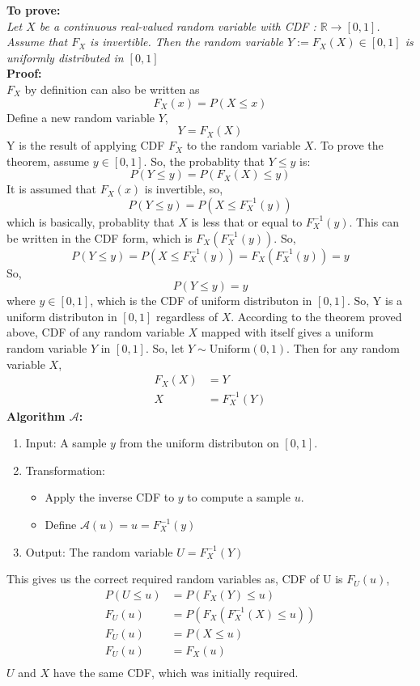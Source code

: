 \begin{solution}
	\textbf{To prove: }\\
	\emph{Let $X$ be a continuous real-valued random variable with CDF  : $\mathbb{R} \rightarrow [0, 1]$. Assume that
		$F_X$ is invertible. Then the random variable $Y := F_X (X) \in [0, 1]$ is uniformly distributed in $[0, 1]$}\\
	\textbf{Proof:}\\
	$F_X$ by definition can also be written as
	\[F_X(x) = P(X\leq x)\]
	Define a new random variable $Y$,
	\[Y =F_X(X) \]
	Y is the result of applying CDF $F_X$ to the random variable $X$.
	To prove the theorem, assume $y\in [0,1]$. So, the probablity that $Y \leq y$ is:
	\[P(Y\leq y) = P(F_X(X)\leq y)\]
	It is assumed that $F_X(x)$ is invertible, so,
	\[P(Y\leq y) = P(X\leq F_X^{-1}(y))\]
	which is basically, probablity that $X$ is less that or equal to $F_X^{-1}(y)$. This can be written in the CDF form, which is $F_X(F_X^{-1}(y))$. So,
	\[P(Y\leq y) = P(X\leq F_X^{-1}(y)) = F_X(F_X^{-1}(y)) = y\]
	So,
	\[P(Y\leq y) = y\]
	where $y\in [0,1]$, which is the CDF of uniform distributon in $[0,1]$.
	So, Y is a uniform distributon in $[0,1]$ regardless of $X$.
	According to the theorem proved above, CDF of any random variable $X$ mapped with itself gives a uniform
	random variable $Y$ in $[0,1]$. So, let $Y\sim \text{Uniform}(0,1)$. Then for any random variable $X$,
	\begin{align}
		F_X(X) & = Y           \\
		X      & = F_X^{-1}(Y)
	\end{align}
	\textbf{Algorithm $\mathcal{A}$:}
	\begin{enumerate}
		\item Input: A sample $y$ from the uniform distributon on $[0,1]$.
		\item Transformation:
		      \begin{itemize}
			      \item Apply the inverse CDF to $y$ to compute a sample $u$.
			      \item Define $\mathcal{A}(u) = u = F_X^{-1}(y)$
		      \end{itemize}
		\item Output: The random variable $U = F_X^{-1}(Y)$
	\end{enumerate}
	This gives us the correct required random variables as, CDF of U is $F_U(u)$,
	\begin{align}
		P(U\leq u ) & = P(F_X(Y) \leq u)            \\
		F_U(u)      & =  P(F_X(F_X^{-1}(X) \leq u)) \\
		F_U(u)      & =  P(X \leq u)                \\
		F_U(u)      & =  F_X(u)                     \\
	\end{align}
	$U$ and $X$ have the same CDF, which was initially required.
\end{solution}
